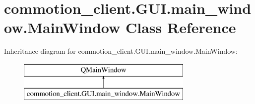 \hypertarget{classcommotion__client_1_1GUI_1_1main__window_1_1MainWindow}{\section{commotion\+\_\+client.\+G\+U\+I.\+main\+\_\+window.\+Main\+Window Class Reference}
\label{classcommotion__client_1_1GUI_1_1main__window_1_1MainWindow}
}
Inheritance diagram for commotion\+\_\+client.\+G\+U\+I.\+main\+\_\+window.\+Main\+Window\+:\begin{figure}[H]
\begin{center}
\leavevmode
\includegraphics[height=2.000000cm]{classcommotion__client_1_1GUI_1_1main__window_1_1MainWindow}
\end{center}
\end{figure}
